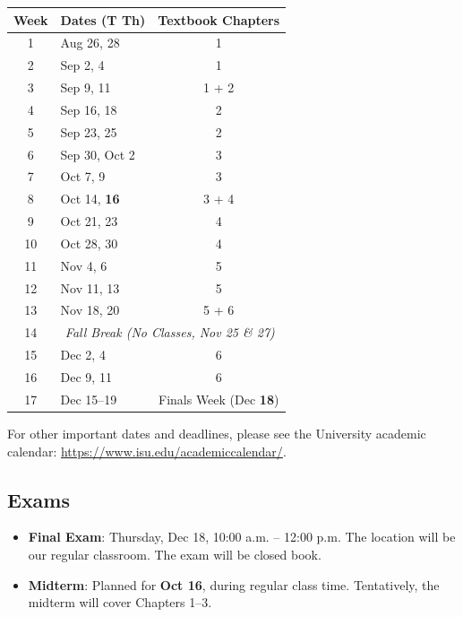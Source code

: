 \documentclass[11pt]{article}\usepackage[]{graphicx}\usepackage[]{xcolor}
\begin{document}
\begin{longtable}{|c|l|c|}
\hline
\textbf{Week} & \textbf{Dates (T Th)} & \textbf{Textbook Chapters} \\
\hline
\endhead

1 & Aug 26, 28     & 1\\\hline
2 & Sep 2, 4       & 1\\\hline
3 & Sep 9, 11      & 1 + 2\\\hline
4 & Sep 16, 18     & 2 \\\hline
5 & Sep 23, 25     & 2 \\\hline
6 & Sep 30, Oct 2  & 3 \\\hline
7 & Oct 7, 9       & 3 \\\hline
8 & Oct 14, {\color{blue} \textbf{16}} & 3 + 4\\\hline
9 & Oct 21, 23     &  4 \\\hline
10 & Oct 28, 30    &  4 \\\hline
11 & Nov 4, 6      &  5 \\\hline
12 & Nov 11, 13    &  5 \\\hline
13 & Nov 18, 20    &  5 + 6\\\hline
14 & \multicolumn{2}{|c|}{\textit{Fall Break (No Classes, Nov 25 \& 27)}} \\\hline
15 & Dec 2, 4      &  6 \\\hline
16 & Dec 9, 11     &  6 \\\hline
17 & Dec 15--19 & Finals Week ({\color{blue}Dec \textbf{18}}) \\ \hline

\end{longtable}


For other important dates and deadlines, please see the University academic calendar: \url{https://www.isu.edu/academiccalendar/}.

\subsection{Exams}

\begin{itemize}
  \item \textbf{Final Exam}: Thursday, Dec 18, 10:00 a.m. -- 12:00 p.m. The location will be our regular classroom. The exam will be closed book.
  \item \textbf{Midterm}: Planned for {\color{blue} \textbf{Oct 16}}, during regular class time. Tentatively, the midterm will cover Chapters 1--3.
\end{itemize}
\end{document}
